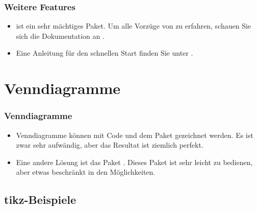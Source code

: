 \begin{frame}[fragile]
\frametitle{Weitere Features}

\begin{itemize}
	\item {} ist ein sehr mächtiges Paket. Um alle Vorzüge von  zu erfahren, schauen Sie sich die Dokumentation an \citep{Zivanovic17a}.
	
	\item Eine Anleitung für den schnellen Start finden Sie unter \citet{VandenWyngaerd16a}.
\end{itemize}

\end{frame}


\section{Venndiagramme}

\begin{frame}[fragile]
\frametitle{Venndiagramme}

\begin{itemize}
	\item Venndiagramme können mit Code und dem Paket  gezeichnet werden. Es ist zwar sehr aufwändig, aber das Resultat ist ziemlich perfekt.
	
	\item Eine andere Lösung ist das Paket . Dieses Paket ist sehr leicht zu bedienen, aber etwas beschränkt in den Möglichkeiten.
\end{itemize}

\end{frame}


\subsection{tikz-Beispiele}

